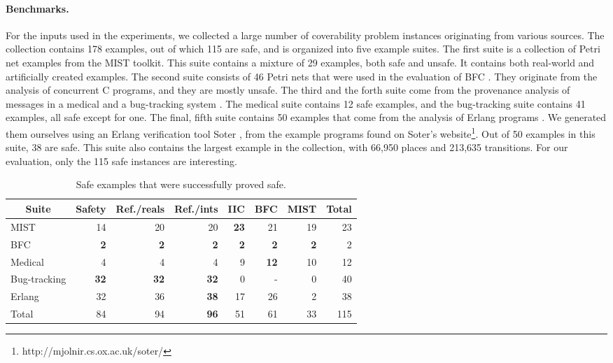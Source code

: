 \paragraph{Benchmarks.} For the inputs used in the experiments, we collected a
large number of coverability problem instances originating from various sources. The
collection contains 178 examples, out of which 115 are safe, and is
organized into five example suites. The first suite is a collection of
Petri net examples from the MIST toolkit. This suite contains a
mixture of 29 examples, both safe and unsafe. It contains both real-world and
artificially created examples. The second suite consists of 46 Petri nets
that were used in the evaluation of BFC \cite{KaiserKWCONCUR12}. They
originate from the analysis of concurrent C programs, and they are mostly
unsafe. The third and the forth suite come from the
provenance analysis of messages in a medical and a bug-tracking system
\cite{MajumdarSAS13}. The medical suite contains 12 safe
examples, and the bug-tracking suite contains 41 examples, all
safe except for one. The final, fifth suite contains 50 examples that
come from the analysis of Erlang programs \cite{DOsualdoSAS13}. We generated
them ourselves using an Erlang verification tool Soter \cite{DOsualdoSAS13},
from the example programs found on Soter's
website\footnote{http://mjolnir.cs.ox.ac.uk/soter/}. Out of 50 examples in this
suite, 38 are safe. This suite also contains the largest example in the
collection, with 66,950 places and 213,635 transitions.
For our evaluation, only the 115 safe instances are interesting.

\begin{table}[t]
  \centering
  \caption{Safe examples that were successfully proved safe.}
  \label{table:rate-of-success}
  \scriptsize
  \begin{tabular}{|l|r|r|r|r|r|r|r|}
    \hline
    \multicolumn{1}{|c|}{Suite} & \multicolumn{1}{|c|}{Safety}
    & \multicolumn{1}{|c|}{Ref./reals} & \multicolumn{1}{|c|}{Ref./ints}
    & \multicolumn{1}{|c|}{IIC} & \multicolumn{1}{|c|}{BFC}
    & \multicolumn{1}{|c|}{MIST} & \multicolumn{1}{|c|}{Total} \\
    \hline
    MIST        & 14 & 20 & 20 & {\bf 23} & 21 & 19 & 23 \\
    BFC          & {\bf 2} & {\bf 2} & {\bf 2} & {\bf 2} & {\bf 2} & {\bf 2} & 2 \\
    Medical      & 4 & 4 & 4 & 9 & {\bf 12} & 10 & 12 \\
    Bug-tracking & {\bf 32} & {\bf 32} & {\bf 32} & 0 & - & 0 & 40 \\
    Erlang       & 32 & 36 & {\bf 38} & 17 & 26 & 2 & 38 \\
    \hline
    Total        & 84 & 94 & {\bf 96} & 51 & 61 & 33 & 115 \\
    \hline
  \end{tabular}
\end{table}

